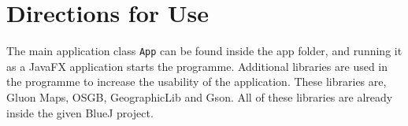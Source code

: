 \section{Directions for Use}
The main application class \verb|App| can be found inside the app folder, and running it as a JavaFX application starts the programme. Additional libraries are used in the programme to increase the usability of the application. These libraries are, Gluon Maps, OSGB, GeographicLib and Gson.
All of these libraries are already inside the given BlueJ project.